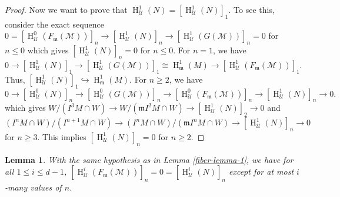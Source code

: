 \documentclass[11pt,reqno]{amsart}
\newtheorem{lemma}[theorem]{Lemma}
\theoremstyle{definition}
\newcommand{\m}{\mathfrak m}
\def\U{{\mathcal U}}
\def\M{{\mathcal M}}
\DeclareMathOperator{\h}{H}
\numberwithin{equation}{section}
\begin{document}
\begin{proof}
        Now we want to prove that $\h^1_\U(N)=[\h^1_\U(N)]_1.$ To see this, consider the exact sequence 
		$0=[\h^0_{\mathcal{U}}(F_\m(\M))]_n\to [\h^1_{\mathcal{U}}(N)]_n\to [\h^1_{\mathcal{U}}(G(\M))]_n=0$ for $n\leq 0$ which gives $[\h^1_{\mathcal{U}}(N)]_n=0$ for $n\leq 0.$ For $n=1$, we have $0\to [\h^1_{\mathcal{U}}(N)]_1\to [\h^1_{\mathcal{U}}(G(\M))]_1\cong \h^1_\m(M)\to [\h^1_{\mathcal{U}}(F_\m(\M))]_1.$ Thus,  $[\h^1_{\mathcal{U}}(N)]_1 \hookrightarrow \h^1_\m(M).$ For $n\geq 2$, we have 
		$$0\to  [\h^0_{\mathcal{U}}(N)]_n\to  [\h^0_{\mathcal{U}}(G(\M))]_n\to  [\h^0_{\mathcal{U}}(F_\m(\M))]_n\to  [\h^1_{\mathcal{U}}(N)]_n\to 0.$$
		which gives $W/(I^3M\cap W)\to W/(\m I^2M\cap W)\to [\h^1_{\mathcal{U}}(N)]_2\to 0$ and $(I^nM\cap W)/(I^{n+1}M\cap W)\to (I^nM\cap W)/(\m I^nM\cap W)\to[\h^1_{\mathcal{U}}(N)]_n\to 0$ for $n\geq 3.$
		This implies $[\h^1_{\mathcal{U}}(N)]_n=0$ for $n\geq 2.$ 
	\end{proof}
\begin{lemma}\label{fiber-lemma-2} With the same hypothesis as in Lemma \ref{fiber-lemma-1}, we have for all $ 1\leq i \leq d-1$,  
    $[\h^i_\U(F_\m(\M))]_n=0=[\h^i_\U(N)]_n$ except for at most $i$-many values of $n$. 
    \end{lemma}
\end{document}

